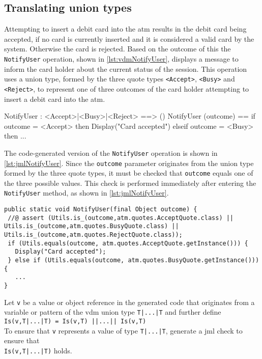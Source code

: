 \subsection{Translating union types}
\label{sec:unions}

Attempting to insert a debit card into the \ac{atm} results in the
debit card being accepted, if no card is currently inserted and it is
considered a valid card by the system. Otherwise the card is
rejected. Based on the outcome of this the \texttt{NotifyUser}
operation, shown in \autoref{lst:vdmNotifyUser}, displays a message to
inform the card holder about the current status of the session. This
operation uses a union type, formed by the three quote types
\texttt{<Accept>}, \texttt{<Busy>} and \texttt{<Reject>}, to represent
one of three outcomes of the card holder attempting to insert a debit
card into the \ac{atm}.

\begin{vdmsl}[style=customVdm,caption={Operation used to notify a
\ac{atm} user.},label={lst:vdmNotifyUser}]
NotifyUser : <Accept>|<Busy>|<Reject> ==> ()
NotifyUser (outcome) ==
if outcome = <Accept> then
  Display("Card accepted")
elseif outcome = <Busy> then
  ...
\end{vdmsl}

\noindent The code-generated version of the \texttt{NotifyUser} operation is
shown in \autoref{lst:jmlNotifyUser}. Since the \texttt{outcome}
parameter originates from the union type formed by the three quote
types, it must be checked that \texttt{outcome} equals one of the three
possible values. This check is performed immediately after entering
the \texttt{NotifyUser} method, as shown in
\autoref{lst:jmlNotifyUser}.

\begin{lstlisting}[style=customJml,caption={Code-generated version of
the \texttt{NotifyUser} operation.},label={lst:jmlNotifyUser}]
public static void NotifyUser(final Object outcome) {
 //@ assert (Utils.is_(outcome,atm.quotes.AcceptQuote.class) || Utils.is_(outcome,atm.quotes.BusyQuote.class) || Utils.is_(outcome,atm.quotes.RejectQuote.class));
 if (Utils.equals(outcome, atm.quotes.AcceptQuote.getInstance())) {
   Display("Card accepted");
 } else if (Utils.equals(outcome, atm.quotes.BusyQuote.getInstance())){
   ...
}
\end{lstlisting}

 {Let \texttt{v} be a value or
  object reference in the generated code that originates from a
  variable or pattern of the \ac{vdm} union type
  \texttt{T|...|T} and further define\\
  \texttt{Is(v,T|...|T) = Is(v,T) ||...|| Is(v,T)}\\
  To ensure that \texttt{v} represents a value of type
  \texttt{T|...|T}, generate a \ac{jml}
  check to ensure that\\
  \texttt{Is(v,T|...|T)} holds.}

